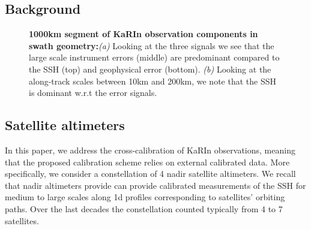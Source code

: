 \begin{bibunit}
\section{Background}
\label{c3sec:background}
\noindent
\begin{figure}[!t]%
   \centering
    \caption{\textbf{1000km segment of KaRIn observation components in swath geometry:}\textit{(a)} Looking at the three signals we see that the large scale instrument errors (middle) are predominant compared to the SSH (top) and geophysical error (bottom). \textit{(b)} Looking at the along-track scales between 10km and 200km, we note that the SSH is dominant w.r.t the error signals.}%
    \label{c3fig:filtered_swath_uncal_comp}%
\end{figure}
\subsection{Satellite altimeters}
In this paper, we address the cross-calibration of KaRIn observations, meaning that the proposed calibration scheme relies on external calibrated data. More specifically, we consider a constellation of  4 nadir satellite altimeters. We recall that nadir altimeters provide can provide calibrated measurements of the SSH for medium to large scales along 1{\sc d} profiles corresponding to satellites' orbiting paths. Over the last decades the constellation counted typically from 4 to 7 satellites.


\end{bibunit}
